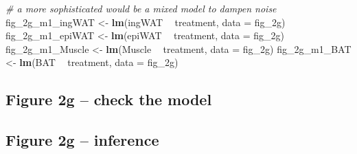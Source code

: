 \documentclass[]{book}
\newenvironment{Shaded}{\begin{snugshade}}{\end{snugshade}}
\newcommand{\CommentTok}[1]{\textcolor[rgb]{0.56,0.35,0.01}{\textit{#1}}}
\newcommand{\DataTypeTok}[1]{\textcolor[rgb]{0.13,0.29,0.53}{#1}}
\newcommand{\KeywordTok}[1]{\textcolor[rgb]{0.13,0.29,0.53}{\textbf{#1}}}
\newcommand{\NormalTok}[1]{#1}
\newcommand{\OperatorTok}[1]{\textcolor[rgb]{0.81,0.36,0.00}{\textbf{#1}}}
\newcommand{\StringTok}[1]{\textcolor[rgb]{0.31,0.60,0.02}{#1}}
\begin{document}
\begin{Shaded}
\begin{Highlighting}[]
\CommentTok{# a more sophisticated would be a mixed model to dampen noise}
\NormalTok{fig_2g_m1_ingWAT <-}\StringTok{ }\KeywordTok{lm}\NormalTok{(ingWAT }\OperatorTok{~}\StringTok{ }\NormalTok{treatment, }\DataTypeTok{data =}\NormalTok{ fig_2g)}
\NormalTok{fig_2g_m1_epiWAT <-}\StringTok{ }\KeywordTok{lm}\NormalTok{(epiWAT }\OperatorTok{~}\StringTok{ }\NormalTok{treatment, }\DataTypeTok{data =}\NormalTok{ fig_2g)}
\NormalTok{fig_2g_m1_Muscle <-}\StringTok{ }\KeywordTok{lm}\NormalTok{(Muscle }\OperatorTok{~}\StringTok{ }\NormalTok{treatment, }\DataTypeTok{data =}\NormalTok{ fig_2g)}
\NormalTok{fig_2g_m1_BAT <-}\StringTok{ }\KeywordTok{lm}\NormalTok{(BAT }\OperatorTok{~}\StringTok{ }\NormalTok{treatment, }\DataTypeTok{data =}\NormalTok{ fig_2g)}
\end{Highlighting}
\end{Shaded}

\hypertarget{figure-2g-check-the-model}{%
\subsection{Figure 2g -- check the model}\label{figure-2g-check-the-model}}

\hypertarget{figure-2g-inference}{%
\subsection{Figure 2g -- inference}\label{figure-2g-inference}}
\end{document}
